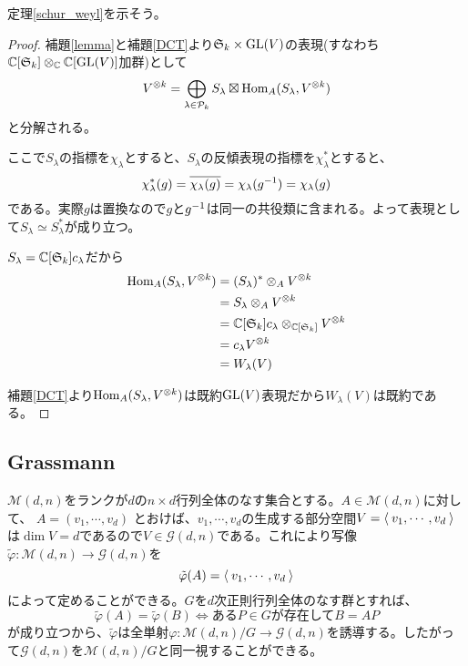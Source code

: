 \documentclass{ltjsreport}
\begin{document}
定理\ref{schur_weyl}を示そう。
\begin{proof}
  補題\ref{lemma}と補題\ref{DCT}より$\mathfrak{S}_k\times\text{GL}(V)$の表現(すなわち$\mathbb{C}[\mathfrak{S}_k]\otimes_{\mathbb{C}}\mathbb{C}[\text{GL}(V)]$加群)として
  \[
  V^{\otimes k}=\bigoplus_{\lambda\in\mathcal{P}_k}S_\lambda\boxtimes \text{Hom}_A(S_\lambda,V^{\otimes k})  
  \]
  と分解される。
  
  ここで$S_\lambda$の指標を$\chi_\lambda$とすると、$S_\lambda$の反傾表現の指標を$\chi^*_\lambda$とすると、
  \[
  \chi^*_\lambda(g)=\overline{\chi_\lambda(g)}=\chi_\lambda(g^{-1})=\chi_\lambda(g)  
  \]
  である。実際$g$は置換なので$g$と$g^{-1}$は同一の共役類に含まれる。よって表現として$S_\lambda\simeq S_\lambda^*$が成り立つ。

  $S_\lambda=\mathbb{C}[\mathfrak{S}_k]c_\lambda$だから
  \begin{align*}
    \text{Hom}_A(S_\lambda,V^{\otimes k})
    &=(S_\lambda)^*\otimes_AV^{\otimes k}\\
    &=S_\lambda\otimes_AV^{\otimes k}\\
    &=\mathbb{C}[\mathfrak{S}_k]c_\lambda\otimes_{\mathbb{C}[\mathfrak{S}_k]}V^{\otimes k}\\
    &=c_\lambda V^{\otimes k}\\
    &=W_\lambda(V)
  \end{align*}

  補題\ref{DCT}より$\text{Hom}_A(S_\lambda,V^{\otimes k})$は既約$\text{GL}(V)$表現だから$W_\lambda(V)$は既約である。
\end{proof}





\subsection{Grassmann}

$\mathcal{M}(d,n)$をランクが$d$の$n\times d$行列全体のなす集合とする。$A\in\mathcal{M}(d,n)$に対して、
$
A=(v_1,\cdots,v_d)  
$
とおけば、$v_1,\cdots,v_d$の生成する部分空間$V=\langle\:v_1,\cdots,v_d\:\rangle$は$\dim V = d$であるので$V\in\mathcal{G}(d,n)$である。これにより写像$\tilde{\varphi}:\mathcal{M}(d,n)\rightarrow \mathcal{G}(d,n)$を
\[
\tilde{\varphi}(A)=\langle\:v_1,\cdots,v_d\:\rangle  
\]
によって定めることができる。$G$を$d$次正則行列全体のなす群とすれば、
\[
\tilde{\varphi}(A)=\tilde{\varphi}(B)\Leftrightarrow\text{ある$P\in G$が存在して}B=AP
\]
が成り立つから、$\tilde{\varphi}$は全単射$\varphi:\mathcal{M}(d,n)/G\rightarrow \mathcal{G}(d,n)$を誘導する。したがって$\mathcal{G}(d,n)$を$\mathcal{M}(d,n)/G$と同一視することができる。
\end{document}
